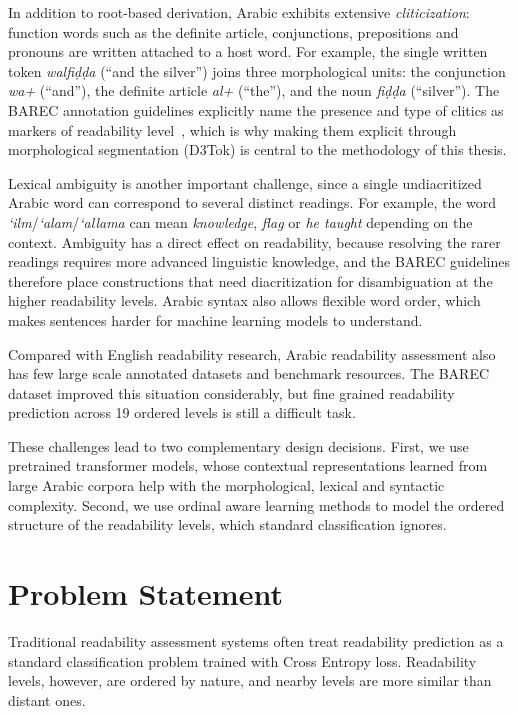 In addition to root-based derivation, Arabic exhibits extensive \emph{cliticization}: function words such as the definite article, conjunctions, prepositions and pronouns are written attached to a host word. For example, the single written token \textit{walfi\d{d}\d{d}a} (``and the silver'') joins three morphological units: the conjunction \textit{wa+} (``and''), the definite article \textit{al+} (``the''), and the noun \textit{fi\d{d}\d{d}a} (``silver''). The BAREC annotation guidelines explicitly name the presence and type of clitics as markers of readability level~\cite{habash2025guidelines}, which is why making them explicit through morphological segmentation (D3Tok) is central to the methodology of this thesis.

Lexical ambiguity is another important challenge, since a single undiacritized Arabic word can correspond to several distinct readings. For example, the word \textit{`ilm}/\textit{`alam}/\textit{`allama} can mean \emph{knowledge}, \emph{flag} or \emph{he taught} depending on the context. Ambiguity has a direct effect on readability, because resolving the rarer readings requires more advanced linguistic knowledge, and the BAREC guidelines therefore place constructions that need diacritization for disambiguation at the higher readability levels. Arabic syntax also allows flexible word order, which makes sentences harder for machine learning models to understand.

Compared with English readability research, Arabic readability assessment also has few large scale annotated datasets and benchmark resources. The BAREC dataset improved this situation considerably, but fine grained readability prediction across 19 ordered levels is still a difficult task.

These challenges lead to two complementary design decisions. First, we use pretrained transformer models, whose contextual representations learned from large Arabic corpora help with the morphological, lexical and syntactic complexity. Second, we use ordinal aware learning methods to model the ordered structure of the readability levels, which standard classification ignores.
\section{Problem Statement}
Traditional readability assessment systems often treat readability prediction as a standard classification problem trained with Cross Entropy loss. Readability levels, however, are ordered by nature, and nearby levels are more similar than distant ones.


